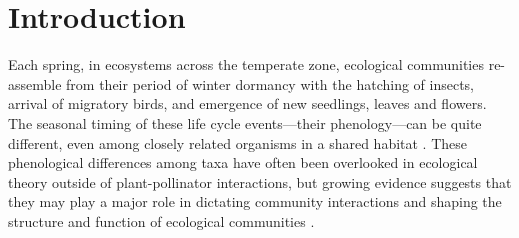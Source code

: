 \documentclass{article}[12pt]
\begin{document}


\section{Introduction}
Each spring, in ecosystems across the temperate zone, ecological communities re-assemble from their period of winter dormancy with the hatching of insects, arrival of migratory birds, and emergence of new seedlings, leaves and flowers. The seasonal timing of these life cycle events---their phenology---can be quite different, even among closely related organisms in a shared habitat \citep{Ovaskainen2013,An2022}. These phenological differences among taxa have often been overlooked in ecological theory outside of plant-pollinator interactions, but growing evidence suggests that they may play a major role in dictating community interactions and shaping the structure and function of ecological communities \citep{Cleland2024,Blackford_2020,volkerisaj}. 
\end{document}
